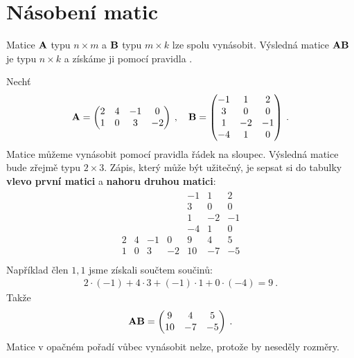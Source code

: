 \section*{Násobení matic}

Matice $\mathbf{A}$ typu $n \times m$ a $\mathbf{B}$ typu $m \times k$ lze spolu vynásobit. Výsledná matice $\mathbf{A} \mathbf{B}$ je typu $n \times k$ a získáme ji pomocí pravidla .

\begin{example}
    Nechť
    \begin{align}
        \mathbf{A} = \begin{pmatrix}
            2 & 4 & -1 & 0 \\
            1 & 0 & 3 & -2
        \end{pmatrix}
        \:, \quad
        \mathbf{B} = \begin{pmatrix}
            -1 & 1 & 2 \\
            3 & 0 & 0 \\
            1 & -2 & -1 \\
            -4 & 1 & 0 \\
        \end{pmatrix} \:.
    \end{align}
    Matice můžeme vynásobit pomocí pravidla řádek na sloupec. Výsledná matice bude zřejmě typu $2 \times 3$. Zápis, který může být užitečný, je sepsat si do tabulky \textbf{vlevo první matici} a \textbf{nahoru druhou matici}:
    \begin{align}
        \begin{array}{rrrr|rrr}
            &&&&-1 & 1 & 2 \\
            &&&&3 & 0 & 0 \\
            &&&&1 & -2 & -1 \\
            &&&&-4 & 1 & 0 \\
            \hline
            2 & 4 & -1 & 0 &     9 & 4 & 5\\
            1 & 0 & 3 & -2 &     10 & -7 & -5\\
        \end{array}
    \end{align}
    Například člen $1,1$ jsme získali součtem součinů: 
    \begin{align}
        2 \cdot (-1) + 4 \cdot 3 + (-1) \cdot 1 + 0 \cdot (-4) = 9 \:.
    \end{align}
    Takže \begin{align}
        \mathbf{A} \mathbf{B} = \begin{pmatrix}
            9 & 4 & 5 \\
            10 & -7 & -5
        \end{pmatrix} \:.
    \end{align}
    Matice v opačném pořadí vůbec vynásobit nelze, protože by neseděly rozměry.
\end{example}

